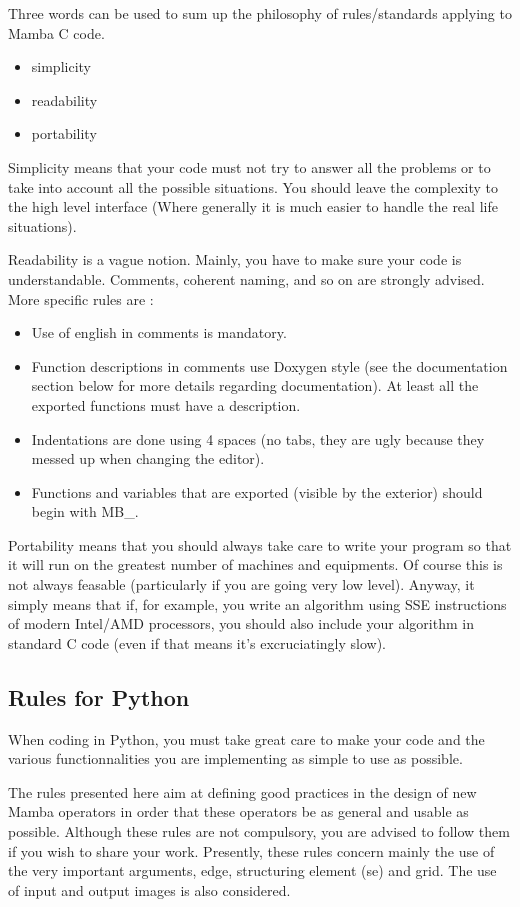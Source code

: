 \documentclass[a4paper,10pt,oneside]{article}
\begin{document}
Three words can be used to sum up the philosophy of rules/standards
applying to Mamba C code.
\begin{itemize}
\item simplicity 
\item readability 
\item portability 
\end{itemize}
Simplicity means that your code must not try to answer all the problems
or to take into account all the possible situations. You should leave
the complexity to the high level interface (Where generally it is
much easier to handle the real life situations).

Readability is a vague notion. Mainly, you have to make sure your
code is understandable. Comments, coherent naming, and so on are strongly
advised. More specific rules are :
\begin{itemize}
\item Use of english in comments is mandatory.
\item Function descriptions in comments use Doxygen style (see the documentation
section below for more details regarding documentation). At least all the 
exported functions must have a description.
\item Indentations are done using 4 spaces (no tabs, they are ugly because
they messed up when changing the editor). 
\item Functions and variables that are exported (visible by the exterior)
should begin with \textquotedbl{}MB\_\textquotedbl{}. 
\end{itemize}
Portability means that you should always take care to write your program
so that it will run on the greatest number of machines and equipments.
Of course this is not always feasable (particularly if you are going
very low level). Anyway, it simply means that if, for example, you
write an algorithm using SSE instructions of modern Intel/AMD processors,
you should also include your algorithm in standard C code (even if
that means it's excruciatingly slow).

\subsection{Rules for Python}

When coding in Python, you must take great care to make your code and the
various functionnalities you are implementing as simple to use as possible.

The rules presented here aim at defining good practices in the design of new 
Mamba operators in order that these operators be as general and usable as 
possible. Although these rules are not compulsory, you are advised to follow 
them if you wish to share your work. Presently, these rules concern mainly the
use of the very important arguments, edge, structuring element (se) and grid.
The use of input and output images is also considered.
\end{document}
